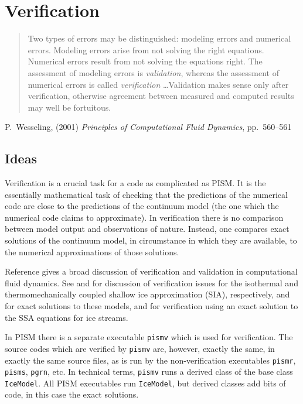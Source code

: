 
\section{Verification}\label{sect:verif}

\bigskip
\begin{quote}  Two types of errors may be distinguished: modeling errors and numerical errors.  Modeling errors arise from not solving the right equations.  Numerical errors result from not solving the equations right.  The assessment of modeling errors is \emph{validation}, whereas the assessment of numerical errors is called \emph{verification} \dots  Validation makes sense only after verification, otherwise agreement between measured and computed results may well be fortuitous.
\end{quote}
\hfill P.~Wesseling, (2001)  \emph{Principles of Computational Fluid Dynamics}, pp.~560--561 \cite{Wesseling}
\bigskip

\subsection{Ideas}  Verification is a crucial task for a code as complicated as PISM.  It is the essentially mathematical task of checking that the predictions of the numerical code are close to the predictions of the continuum model (the one which the numerical code claims to approximate).  In verification there is no comparison between model output and observations of nature.  Instead, one compares exact solutions of the continuum model, in circumstance in which they are available, to the numerical approximations of those solutions.

Reference \cite{Roache} gives a broad discussion of verification and validation in computational fluid dynamics. See \cite{BLKCB} and \cite{BBL} for discussion of verification issues for the isothermal and thermomechanically coupled shallow ice approximation (SIA), respectively, and for exact solutions to these models, and \cite{BBssasliding,SchoofStream} for verification using an exact solution to the SSA equations for ice streams.  

In PISM there is a separate executable \texttt{pismv} which is used for verification.  The source codes which are verified by \texttt{pismv} are, however, exactly the same, in exactly the same source files, as is run by the non-verification executables \texttt{pismr}, \texttt{pisms}, \texttt{pgrn}, etc.  In technical terms, \texttt{pismv} runs a derived class of the base class \texttt{IceModel}.  All PISM executables run \texttt{IceModel}, but derived classes add bits of code, in this case the exact solutions.

